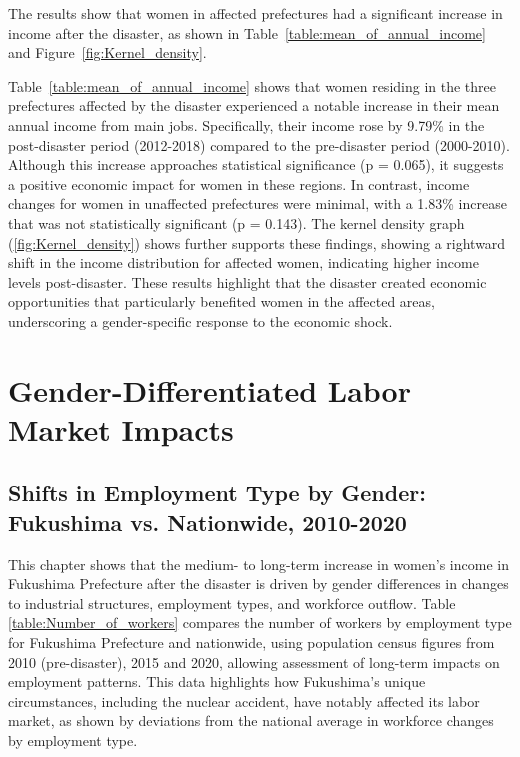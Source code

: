 \documentclass[a4paper,12pt]{article}
\begin{document}
The results show that women in affected prefectures had a significant increase in income after the disaster, as shown in Table~\ref{table:mean_of_annual_income} and Figure~\ref{fig:Kernel_density}.


Table~\ref{table:mean_of_annual_income} shows that women residing in the three prefectures affected by the disaster experienced a notable increase in their mean annual income from main jobs. Specifically, their income rose by 9.79\% in the post-disaster period (2012-2018) compared to the pre-disaster period (2000-2010). Although this increase approaches statistical significance (p = 0.065), it suggests a positive economic impact for women in these regions. In contrast, income changes for women in unaffected prefectures were minimal, with a 1.83\% increase that was not statistically significant (p = 0.143). The kernel density graph (\ref{fig:Kernel_density}) shows further supports these findings, showing a rightward shift in the income distribution for affected women, indicating higher income levels post-disaster. These results highlight that the disaster created economic opportunities that particularly benefited women in the affected areas, underscoring a gender-specific response to the economic shock.




\section{Gender-Differentiated Labor Market Impacts}

\subsection{Shifts in Employment Type by Gender: Fukushima vs. Nationwide, 2010-2020}

This chapter shows that the medium- to long-term increase in women’s income in Fukushima Prefecture after the disaster is driven by gender differences in changes to industrial structures, employment types, and workforce outflow. 
Table \ref{table:Number_of_workers} compares the number of workers by employment type for Fukushima Prefecture and nationwide, using population census figures from 2010 (pre-disaster), 2015 and 2020, allowing assessment of long-term impacts on employment patterns. This data highlights how Fukushima's unique circumstances, including the nuclear accident, have notably affected its labor market, as shown by deviations from the national average in workforce changes by employment type.
\end{document}
